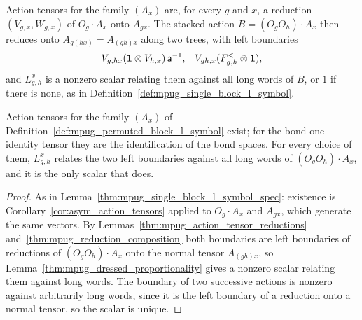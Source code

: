 \begin{definition}
    \label{def:mpug_permuted_block_l_symbol}
    \leanok
    Action tensors for the family $(A_x)$ are, for every $g$ and $x$, a
    reduction $(V_{g,x},W_{g,x})$ of $O_g\cdot A_x$ onto $A_{gx}$. The stacked
    action $B=(O_gO_h)\cdot A_x$ then reduces onto $A_{g(hx)}=A_{(gh)x}$ along
    two trees, with left boundaries
    \begin{align}
        V_{g,hx}(\mathbf 1\otimes V_{h,x})\,\mathsf a^{-1}, &  &
        V_{gh,x}(F^<_{g,h}\otimes\mathbf 1),
        \notag
    \end{align}
    and $L^x_{g,h}$ is a nonzero scalar relating them against all long
    words of $B$, or $1$ if there is none, as in
    Definition~\ref{def:mpug_single_block_l_symbol}.
\end{definition}

\begin{lemma}
    \label{thm:mpug_permuted_block_l_symbol_spec}
    \leanok
    Action tensors for the family $(A_x)$ of
    Definition~\ref{def:mpug_permuted_block_l_symbol} exist; for the bond-one
    identity tensor they are the identification of the bond spaces. For
    every choice of them, $L^x_{g,h}$ relates the two left boundaries against
    all long words of $(O_gO_h)\cdot A_x$, and it is the only scalar that
    does.
\end{lemma}

\begin{proof}\leanok
    As in Lemma~\ref{thm:mpug_single_block_l_symbol_spec}: existence is
    Corollary~\ref{cor:asym_action_tensors} applied to $O_g\cdot A_x$ and
    $A_{gx}$, which generate the same vectors. By
    Lemmas~\ref{thm:mpug_action_tensor_reductions}
    and~\ref{thm:mpug_reduction_composition} both boundaries are left
    boundaries of reductions of $(O_gO_h)\cdot A_x$ onto the normal tensor
    $A_{(gh)x}$, so Lemma~\ref{thm:mpug_dressed_proportionality} gives a
    nonzero scalar relating them against long words. The boundary of two
    successive actions is nonzero against arbitrarily long words, since it is
    the left boundary of a reduction onto a normal tensor, so the scalar is
    unique.
\end{proof}

